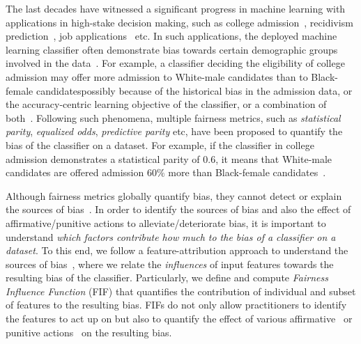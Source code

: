 The last decades have witnessed a significant progress in machine learning with applications in high-stake decision making, such as college admission~\cite{martinez2021using}, recidivism prediction~\cite{tollenaar2013method}, job applications~\cite{ajunwa2016hiring} etc. In such applications, the deployed machine learning classifier often demonstrate bias towards certain demographic groups involved in the data~\cite{dwork2012fairness}. For example, a classifier deciding the eligibility of college admission may offer more admission to White-male candidates than to Black-female candidates\textemdash possibly because of the historical bias in the admission data, or the accuracy-centric learning objective of the classifier, or a combination of both~\cite{berk2019accuracy,landy1978correlates,zliobaite2015relation}. Following such phenomena, multiple fairness metrics, such as \textit{statistical parity}, \textit{equalized odds}, \textit{predictive parity} etc, have been proposed to quantify the bias of the classifier on a dataset. For example, if the classifier in college admission demonstrates a {statistical parity} of $ 0.6 $, it means that White-male candidates are offered admission $ 60\% $ more than Black-female candidates~\cite{besse2021survey,feldman2015certifying,garg2020fairness}.

Although fairness metrics globally quantify bias, they cannot detect or explain the sources of bias~\cite{begley2020explainability,lundberg2020explaining,pan2021explaining}. In order to identify the sources of bias and also the effect of affirmative/punitive actions to alleviate/deteriorate bias, it is important to understand \textit{which factors contribute how much to the bias of a classifier on a dataset}. To this end, we follow a feature-attribution approach to understand the sources of bias~\cite{begley2020explainability,lundberg2020explaining}, where we relate the \emph{influences} of input features towards the resulting bias of the classifier. Particularly, we define and compute \textit{Fairness Influence Function} (FIF) that quantifies the contribution of individual and subset of features to the resulting bias. FIFs do not only allow practitioners to identify the features to act up on but also to quantify the effect of various affirmative~\cite{calmon2017optimized,hardt2016equality,kamiran2012decision,zemel2013learning,zhang2018mitigating,zhang2018fairness,zhang2019faht} or punitive actions~\cite{hua2021human,mehrabi2020exacerbating,solans2020poisoning} on the resulting bias. 


